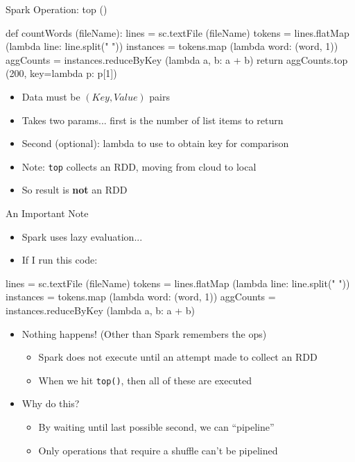 \documentclass[aspectratio=169]{beamer}
\begin{document}
\begin{frame}[fragile]{Spark Operation: top ()}

\begin{SQL}
def countWords (fileName):
     lines = sc.textFile (fileName)
     tokens = lines.flatMap (lambda line: line.split(" "))
     instances = tokens.map (lambda word: (word, 1))
     aggCounts = instances.reduceByKey (lambda a, b: a + b)
     return aggCounts.top (200, key=lambda p: p[1])
\end{SQL}

\begin{itemize}
\item Data must be $(Key, Value)$ pairs
\item Takes two params... first is the number of list items to return
\item Second (optional): lambda to use to obtain key for comparison
\item Note: \texttt{top} collects an RDD, moving from cloud to local
\item So result is \textbf{not} an RDD
\end{itemize}
\end{frame}
\begin{frame}[fragile]{An Important Note}

\begin{itemize}
\item Spark uses lazy evaluation...
\item If I run this code:
\end{itemize}

\begin{SQL}
lines = sc.textFile (fileName)
tokens = lines.flatMap (lambda line: line.split(" "))
instances = tokens.map (lambda word: (word, 1))
aggCounts = instances.reduceByKey (lambda a, b: a + b)
\end{SQL}

\begin{itemize}
\item Nothing happens! (Other than Spark remembers the ops)
	\begin{itemize}
	\item Spark does not execute until an attempt made to collect an RDD
	\item When we hit \texttt{top()}, then all of these are executed
	\end{itemize}
\item Why do this?
	\begin{itemize}
	\item By waiting until last possible second, we can  ``pipeline'' 
	\item Only operations that require a shuffle can't be pipelined
	\end{itemize}
\end{itemize}
\end{frame}
\end{document}
